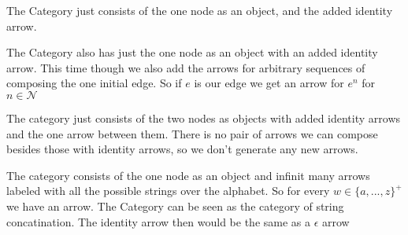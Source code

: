 \documentclass[11pt]{article}
\begin{document}
            The Category just consists of the one node as an object, and the added identity arrow. 

            The Category also has just the one node as an object with an added identity arrow. This time though we also add the arrows for arbitrary sequences of composing the one initial edge. So if $e$ is our edge we get an arrow for $e^n$ for $n \in \mathcal{N}$

            The category just consists of the two nodes as objects with added identity arrows and the one arrow between them. There is no pair of arrows we can compose besides those with identity arrows, so we don't generate any new arrows.

            The category consists of the one node as an object and infinit many arrows labeled with all the possible strings over the alphabet. So for every $w \in \{a,...,z\}^+$ we have an arrow. The Category can be seen as the category of string concatination. The identity arrow then would be the same as a $\epsilon$ arrow
\end{document}
